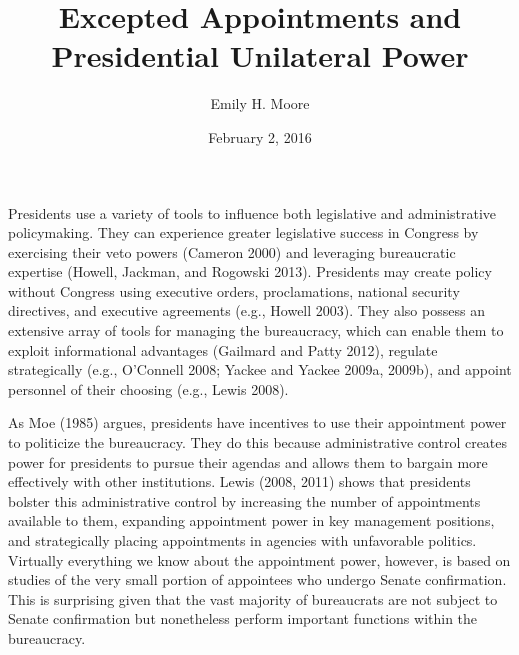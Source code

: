 \documentclass[12pt]{article}
\title{Excepted Appointments and Presidential Unilateral Power}
\date{February 2, 2016}
\author{Emily H. Moore}
\begin{document}

\maketitle
\parindent=0.5in
\parskip=0.01in
\doublespacing



Presidents use a variety of tools to influence both legislative and administrative policymaking. They can experience greater legislative success in Congress by exercising their veto powers (Cameron 2000) and leveraging bureaucratic expertise (Howell, Jackman, and Rogowski 2013). Presidents may create policy without Congress using executive orders, proclamations, national security directives, and executive agreements (e.g., Howell 2003). They  also possess an extensive array of tools for managing the bureaucracy, which can enable them to exploit informational advantages (Gailmard and Patty 2012), regulate strategically (e.g., O'Connell 2008; Yackee and Yackee 2009a, 2009b), and appoint personnel of their choosing (e.g., Lewis 2008). 

	As Moe (1985) argues, presidents have incentives to use their appointment power to politicize the bureaucracy. They do this because administrative control creates power for presidents to pursue their agendas and allows them to bargain more effectively with other institutions.  Lewis (2008, 2011) shows that presidents bolster this administrative control by increasing the number of appointments available to them, expanding appointment power in key management positions, and strategically placing appointments in agencies with unfavorable politics. Virtually everything we know about the appointment power, however, is based on studies of the very small portion of appointees who undergo Senate confirmation. This is surprising given that the vast majority of bureaucrats are not subject to Senate confirmation but nonetheless perform important functions within the bureaucracy.
	
\end{document}
